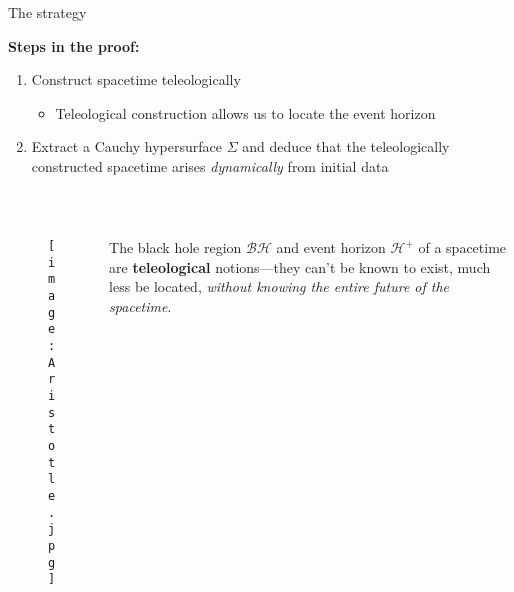 \documentclass[compress,usenames,dvipsnames,8pt]{beamer}
\theoremstyle{definition}
\renewcommand{\(}{\begin{columns}}
\renewcommand{\)}{\end{columns}}
\newcommand{\<}[1]{\begin{column}{#1}}
\renewcommand{\>}{\end{column}}
\begin{document}
\begin{frame}{The strategy}

\textbf{Steps in the proof:} \pause

\begin{enumerate}
\item Construct spacetime teleologically \pause
\begin{itemize}
\item Teleological construction allows us to locate the event horizon \pause
\end{itemize}
\item Extract a Cauchy hypersurface $\Sigma$ and deduce that the teleologically constructed spacetime arises \emph{dynamically} from initial data
\end{enumerate}

~\\ \pause

\begin{columns}%
		\begin{column}{0.2\textwidth}
			\begin{figure}
				\texttt{[image: Aristotle.jpg]}
			\end{figure}
		\end{column}
		\begin{column}{0.8\textwidth}
			\begin{center}
					The black hole region $\mathcal{BH}$ and event horizon $\mathcal{H}^+$ of a spacetime are \textbf{teleological} notions---they can't be known to exist, much less be located, \emph{without knowing the entire future of the spacetime}. 	\\
						\end{center}
		\end{column}
	\end{columns}


\end{frame}
\end{document}

